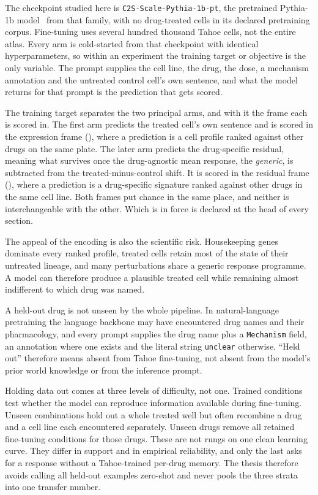 The checkpoint studied here is
\texttt{C2S-Scale-}\allowbreak\texttt{Pythia-}\allowbreak\texttt{1b-pt}, the
pretrained Pythia-1b model~\cite{pythia} from that family, with no drug-treated
cells in its declared pretraining corpus. Fine-tuning uses several hundred
thousand Tahoe cells, not the entire atlas. Every arm is cold-started from that
checkpoint with identical hyperparameters, so within an experiment the training
target or objective is the only variable. The prompt supplies the cell line, the
drug, the dose, a mechanism annotation and the untreated control cell's own
sentence, and what the model returns for that prompt is the prediction that gets
scored.

The training target separates the two principal arms, and with it the frame each
is scored in. The first arm predicts the treated cell's own sentence and is
scored in the expression frame (\Eframe), where a prediction is a cell profile
ranked against other drugs on the same plate. The later arm predicts the
drug-specific residual, meaning what survives once the drug-agnostic mean
response, the \emph{generic}, is subtracted from the treated-minus-control
shift. It is scored in the residual frame (\Rframe), where a prediction is a
drug-specific signature ranked against other drugs in the same cell line. Both
frames put chance in the same place, and neither is interchangeable with the
other. Which is in force is declared at the head of every section.

The appeal of the encoding is also the scientific risk. Housekeeping genes
dominate every ranked profile, treated cells retain most of the state of their
untreated lineage, and many perturbations share a generic response programme. A
model can therefore produce a plausible treated cell while remaining almost
indifferent to which drug was named.

\begin{scopelimit}
A held-out drug is not unseen by the whole pipeline. In natural-language
pretraining the language backbone may have encountered drug names and their
pharmacology, and every prompt supplies the drug name plus a \texttt{Mechanism}
field, an annotation where one exists and the literal string \texttt{unclear}
otherwise.
``Held out'' therefore means absent from Tahoe fine-tuning, not absent from the
model's prior world knowledge or from the inference prompt.
\end{scopelimit}

Holding data out comes at three levels of difficulty, not one. Trained
conditions test whether the model can reproduce information available during
fine-tuning. Unseen combinations hold out a whole treated well but often
recombine a drug and a cell line each encountered separately. Unseen drugs
remove all retained fine-tuning conditions for those drugs. These are not rungs
on one clean learning curve. They differ in support and in empirical
reliability, and only the last asks for a response without a Tahoe-trained
per-drug memory. The thesis therefore avoids calling all held-out examples
zero-shot and never pools the three strata into one transfer number.

